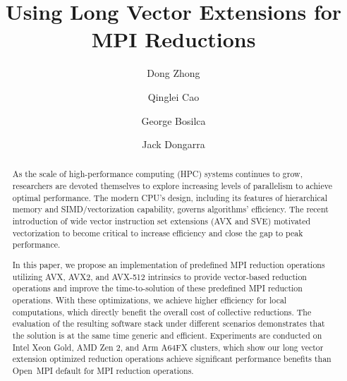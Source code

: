 \documentclass[5p,times,twocolumn]{elsarticle}
\newcommand{\ompi}[0]{Open~MPI\xspace}
\begin{document}
\title{Using Long Vector Extensions for MPI Reductions}

\author[First]{Dong Zhong}

\author[First]{Qinglei Cao}

\author[First]{George Bosilca}

\author[First]{Jack Dongarra}

\address[First]{The University of Tennessee, 1122 Volunteer Blvd, knoxville, TN 37996}

\begin{abstract}
  As the scale of high-performance computing (HPC) systems continues to grow, researchers are devoted themselves to explore increasing levels of parallelism to achieve optimal performance.
  The modern CPU's design, including its features of hierarchical
  memory and SIMD/vectorization capability, governs algorithms'
  efficiency. The recent introduction of wide vector instruction
  set extensions (AVX and SVE) motivated vectorization to become
  critical to increase efficiency and close the gap to peak
  performance.

  In this paper, we propose an implementation of predefined MPI
  reduction operations utilizing AVX, AVX2, and AVX-512 intrinsics to
  provide vector-based reduction operations and improve the
  time-to-solution of these predefined MPI reduction operations.  With
  these optimizations, we achieve higher efficiency for local
  computations, which directly benefit the overall cost of collective
  reductions.
  The evaluation of the resulting software stack under different
  scenarios demonstrates that the solution is at the same time generic
  and efficient.  Experiments are conducted on Intel Xeon Gold, AMD Zen 2, and Arm A64FX clusters,
  which show our long vector extension optimized reduction operations
  achieve significant performance benefits than \ompi default for MPI
  reduction operations.
%
\end{abstract}
\end{document}
